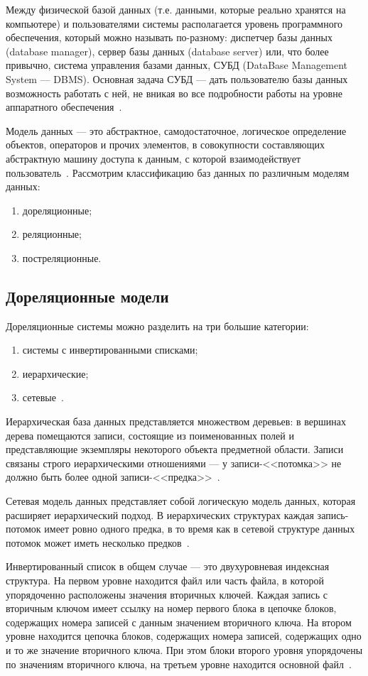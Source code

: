 Между физической базой данных (т.е. данными, которые реально хранятся на компьютере) и пользователями системы располагается уровень программного
обеспечения, который можно называть по-разному: диспетчер базы данных (database 
manager), сервер базы данных (database server) или, что более привычно, система управления базами данных, СУБД (DataBase Management System — DBMS).
Основная задача СУБД --- дать пользователю базы данных возможность работать с ней, не вникая во все подробности работы на уровне аппаратного обеспечения~\cite{williams-db}.

Модель данных — это абстрактное, самодостаточное, логическое определение объектов, операторов и прочих элементов, в совокупности составляющих абстрактную машину доступа к данным, с которой взаимодействует пользователь~\cite{williams-db}.
Рассмотрим классификацию баз данных по различным моделям данных:
\begin{enumerate}
	\item дореляционные;
	\item реляционные;
	\item постреляционные.
\end{enumerate}

\subsection{Дореляционные модели}
Дореляционные системы можно разделить на три большие категории:
\begin{enumerate}
	\item системы с инвертированными списками;
	\item иерархические;
	\item сетевые~\cite{williams-db}.
\end{enumerate}
Иерархическая база данных представляется множеством 
деревьев: в вершинах дерева помещаются записи, состоящие из поименованных 
полей и представляющие экземпляры некоторого объекта предметной области. 
Записи связаны строго иерархическими отношениями --- у записи-<<потомка>> не 
должно быть более одной записи-<<предка>>~\cite{wolf-db}.

Сетевая модель данных представляет собой логическую модель данных, которая расширяет иерархический подход. В иерархических структурах каждая запись-потомок имеет ровно одного предка, в то время как в сетевой структуре данных потомок может иметь несколько предков~\cite{wolf-db}.

Инвертированный список в общем случае — это двухуровневая индексная структура. На первом уровне находится файл или часть файла, в которой упорядоченно расположены значения вторичных ключей. Каждая запись с вторичным ключом имеет ссылку на номер первого блока в цепочке блоков, содержащих номера записей с данным значением вторичного ключа. На втором уровне находится цепочка блоков, содержащих номера записей, содержащих одно и то же значение вторичного ключа. При этом блоки второго уровня упорядочены по значениям вторичного ключа, на третьем уровне находится основной файл~\cite{inverted-lists}.

